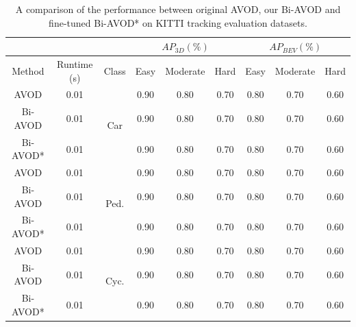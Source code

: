 \documentclass{bmvc2k}
\begin{document}
\begin{table}[]\centering
	\small
	\begin{tabular}{ccccccccc}
				 &   		   &  											& \multicolumn{3}{c}{$AP_{3D}(\%)$}  		 & \multicolumn{3}{c}{$AP_{BEV}(\%)$} \\ \hline
		Method   & Runtime (s) & \multicolumn{1}{c|}{Class}  				& Easy & Moderate & \multicolumn{1}{c|}{Hard} & Easy    & Moderate    & Hard    \\ \hline
		AVOD     & 0.01        & \multicolumn{1}{c|}{\multirow{3}{*}{Car}}  & 0.90 & 0.80     & \multicolumn{1}{c|}{0.70} & 0.80    & 0.70        & 0.60    \\
		Bi-AVOD  & 0.01        & \multicolumn{1}{c|}{}                      & 0.90 & 0.80     & \multicolumn{1}{c|}{0.70} & 0.80    & 0.70        & 0.60    \\
		Bi-AVOD* & 0.01        & \multicolumn{1}{c|}{}                      & 0.90 & 0.80     & \multicolumn{1}{c|}{0.70} & 0.80    & 0.70        & 0.60    \\ \hline
		AVOD     & 0.01        & \multicolumn{1}{c|}{\multirow{3}{*}{Ped.}} & 0.90 & 0.80     & \multicolumn{1}{c|}{0.70} & 0.80    & 0.70        & 0.60    \\
		Bi-AVOD  & 0.01        & \multicolumn{1}{c|}{}                      & 0.90 & 0.80     & \multicolumn{1}{c|}{0.70} & 0.80    & 0.70        & 0.60    \\
		Bi-AVOD* & 0.01        & \multicolumn{1}{c|}{}                      & 0.90 & 0.80     & \multicolumn{1}{c|}{0.70} & 0.80    & 0.70        & 0.60    \\ \hline
		AVOD     & 0.01        & \multicolumn{1}{c|}{\multirow{3}{*}{Cyc.}} & 0.90 & 0.80     & \multicolumn{1}{c|}{0.70} & 0.80    & 0.70        & 0.60    \\
		Bi-AVOD  & 0.01        & \multicolumn{1}{c|}{}                      & 0.90 & 0.80     & \multicolumn{1}{c|}{0.70} & 0.80    & 0.70        & 0.60    \\
		Bi-AVOD* & 0.01        & \multicolumn{1}{c|}{}                      & 0.90 & 0.80     & \multicolumn{1}{c|}{0.70} & 0.80    & 0.70        & 0.60    \\ \hline
	\end{tabular}
	\setlength{\abovecaptionskip}{1pt}
	\caption{A comparison of the performance between original AVOD, our Bi-AVOD and fine-tuned Bi-AVOD* on KITTI tracking evaluation datasets.}
	\label{table:result_detection}
	\vspace{-0.4cm}
\end{table}
\end{document}
